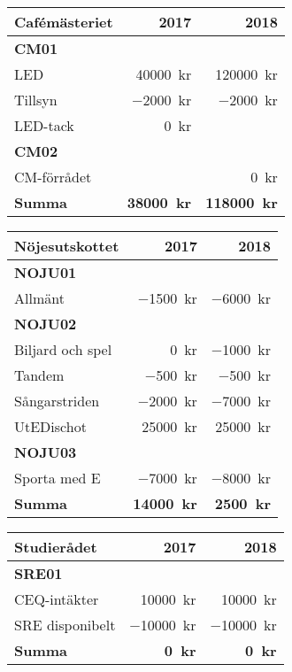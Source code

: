 \documentclass[10pt]{article}
\begin{document}
\begin{tabularx}{10cm}{X r r}
    \textbf{\large Cafémästeriet} & \textbf{2017} & \textbf{2018} \\
    \hline
    \textbf{CM01} \\
    LED & \SI{40000}{kr} & \SI{120000}{kr} \\
    Tillsyn & \SI{-2000}{kr} & \SI{-2000}{kr} \\
    LED-tack & \SI{0}{kr} & \\
    \textbf{CM02} \\
    CM-förrådet & & \SI{0}{kr} \\
    \hline
    \textbf{Summa} & \textbf{\SI{38000}{kr}} & \textbf{\SI{118000}{kr}} \\
\end{tabularx}

\begin{tabularx}{10cm}{X r r}
    \textbf{\large Nöjesutskottet} & \textbf{2017} & \textbf{2018} \\
    \hline
    \textbf{NOJU01} \\
    Allmänt & \SI{-1500}{kr} & \SI{-6000}{kr} \\
    \textbf{NOJU02} \\
    Biljard och spel & \SI{0}{kr} & \SI{-1000}{kr} \\
    Tandem & \SI{-500}{kr} & \SI{-500}{kr} \\
    Sångarstriden & \SI{-2000}{kr} & \SI{-7000}{kr} \\
    UtEDischot & \SI{25000}{kr} & \SI{25000}{kr} \\
    \textbf{NOJU03} \\
    Sporta med E & \SI{-7000}{kr} & \SI{-8000}{kr} \\
    \hline
    \textbf{Summa} & \textbf{\SI{14000}{kr}} & \textbf{\SI{2500}{kr}} \\
\end{tabularx}

\begin{tabularx}{10cm}{X r r}
    \textbf{\large Studierådet} & \textbf{2017} & \textbf{2018} \\
    \hline
    \textbf{SRE01} \\
    CEQ-intäkter & \SI{10000}{kr} & \SI{10000}{kr} \\
    SRE disponibelt & \SI{-10000}{kr} & \SI{-10000}{kr} \\
    \hline
    \textbf{Summa} & \textbf{\SI{0}{kr}} & \textbf{\SI{0}{kr}} \\
\end{tabularx}
\end{document}
